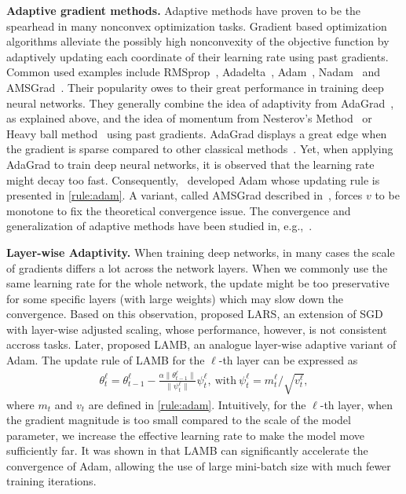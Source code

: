 \documentclass[nohyperref]{article}
\theoremstyle{plain}
\theoremstyle{definition}
\theoremstyle{remark}
\begin{document}
\noindent\textbf{Adaptive gradient methods.}
Adaptive methods have proven to be the spearhead in many nonconvex optimization tasks.
Gradient based optimization algorithms alleviate the possibly high nonconvexity of the objective function by adaptively updating each coordinate of their learning rate using past gradients. 
Common used examples include RMSprop~\citep{TH12}, Adadelta~\citep{Z12}, Adam~\citep{KB15}, Nadam~\citep{dozat2016incorporating} and AMSGrad~\citep{reddi2019convergence}.
Their popularity owes to their great performance in training deep neural networks.
They generally combine the idea of adaptivity from AdaGrad~\citep{DHS11,mcmahan2010adaptive}, as explained above, and the idea of momentum from Nesterov's Method~\citep{N04} or Heavy ball method~\citep{P64} using past gradients.
AdaGrad displays a great edge when the gradient is sparse compared to other classical methods~\cite{DHS11}. Yet, when applying AdaGrad to train deep neural networks, it is observed that the learning rate might decay too fast. Consequently,~\citet{KB15} developed Adam whose updating rule is presented in \eqref{rule:adam}. 
A variant, called AMSGrad described in~\citet{reddi2019convergence}, forces $v$ to be monotone to fix the theoretical convergence issue. The convergence and generalization of adaptive methods have been studied in, e.g.,~\cite{zhou2018convergence,Proc:Chen_ICLR19,zhou2020towards}. 


\noindent\textbf{Layer-wise Adaptivity.} When training deep networks, in many cases the scale of gradients differs a lot across the network layers. When we commonly use the same learning rate for the whole network, the update might be too preservative for some specific layers (with large weights) which may slow down the convergence. Based on this observation, \citet{Proc:LARS18} proposed LARS, an extension of SGD with layer-wise adjusted scaling, whose performance, however, is not consistent accross tasks. Later, \citet{you2019large} proposed LAMB, an analogue layer-wise adaptive variant of Adam. The update rule of LAMB for the $\ell$-th layer can be expressed as
\begin{align*}
    \theta_t^\ell=\theta_{t-1}^\ell-\frac{\alpha \| \theta_{t-1}^\ell\|}{\|\psi_t^\ell\|}\psi_t^\ell,\ \text{with}\ \psi_t^\ell=m_t^\ell/\sqrt{v_t^\ell},
\end{align*}
where $m_t$ and $v_t$ are defined in \eqref{rule:adam}. Intuitively, for the $\ell$-th layer, when the gradient magnitude is too small compared to the scale of the model parameter, we increase the effective learning rate to make the model move sufficiently far. It was shown in \citet{you2019large} that LAMB can significantly accelerate the convergence of Adam, allowing the use of large mini-batch size with much fewer training iterations. 
\end{document}
